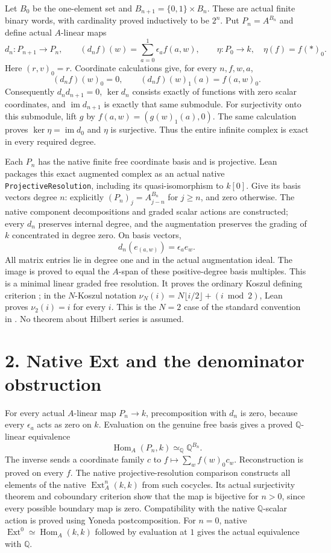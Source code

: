 \documentclass[10pt]{article}
\newcommand{\Q}{\mathbb Q}
\newcommand{\Ext}{\operatorname{Ext}}
\begin{document}
Let $B_0$ be the one-element set and $B_{n+1}=\{0,1\}\times B_n$.
These are actual finite binary words, with cardinality proved inductively to
be $2^n$. Put $P_n=A^{B_n}$ and define actual $A$-linear maps
\[
 d_n:P_{n+1}\longrightarrow P_n,\qquad
 (d_nf)(w)=\sum_{a=0}^1\epsilon_a f(a,w),
 \qquad \eta:P_0\longrightarrow k,\quad\eta(f)=f(*)_0.
\]
Here $(r,v)_0=r$. Coordinate calculations give, for every $n,f,w,a$,
\[
 (d_nf)(w)_0=0,\qquad (d_nf)(w)_1(a)=f(a,w)_0.
\]
Consequently $d_nd_{n+1}=0$,
$\ker d_n$ consists exactly of functions with zero scalar coordinates,
and $\operatorname{im}d_{n+1}$ is exactly that same submodule.
For surjectivity onto this submodule, lift $g$ by
$f(a,w)=(g(w)_1(a),0)$. The same calculation proves
$\ker\eta=\operatorname{im}d_0$ and $\eta$ is surjective.
Thus the entire infinite complex is exact in every required degree.

Each $P_n$ has the native finite free coordinate basis and is projective.
Lean packages this exact augmented complex as an actual native
\texttt{ProjectiveResolution}, including its quasi-isomorphism to $k[0]$.
Give its basis vectors degree $n$: explicitly
$(P_n)_j=A_{j-n}^{B_n}$ for $j\geq n$, and zero otherwise.
The native component decompositions and graded scalar actions are constructed;
every $d_n$ preserves internal degree, and the augmentation preserves the
grading of $k$ concentrated in degree zero. On basis vectors,
\[
 d_n(e_{(a,w)})=\epsilon_a e_w.
\]
All matrix entries lie in degree one and in the actual augmentation ideal.
The image is proved to equal the $A$-span of these positive-degree basis
multiples. This is a minimal linear graded free resolution. It proves the
ordinary Koszul defining criterion \cite[Definition 8.1]{MP}; in the $N$-Koszul
notation $\nu_N(i)=N\lfloor i/2\rfloor+(i\bmod2)$, Lean proves
$\nu_2(i)=i$ for every $i$. This is the $N=2$ case of the standard convention
in \cite[p.~4, Definition 2.2]{Berger}. No theorem about Hilbert series is assumed.

\section*{2. Native Ext and the denominator obstruction}
For every actual $A$-linear map $P_n\to k$, precomposition with $d_n$ is zero,
because every $\epsilon_a$ acts as zero on $k$. Evaluation on the genuine free
basis gives a proved $\Q$-linear equivalence
\[
 \operatorname{Hom}_A(P_n,k)\simeq_\Q\Q^{B_n}.
\]
The inverse sends a coordinate family $c$ to
$f\mapsto\sum_w f(w)_0c_w$. Reconstruction is proved on every $f$.
The native projective-resolution comparison constructs all elements of the
native $\Ext_A^n(k,k)$ from such cocycles. Its actual surjectivity theorem and
coboundary criterion show that the map is bijective for $n>0$, since every
possible boundary map is zero. Compatibility with the native $\Q$-scalar
action is proved using Yoneda postcomposition. For $n=0$, native
$\Ext^0\simeq\operatorname{Hom}_A(k,k)$ followed by evaluation at $1$ gives
the actual equivalence with $\Q$.
\end{document}
